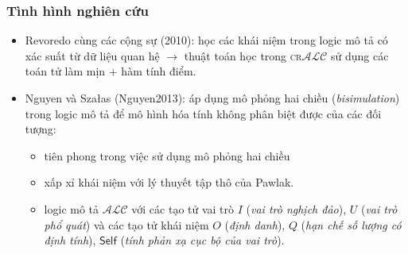 \documentclass[fleqn]{beamer}
\newcommand{\Self}		{\mathsf{Self}}
\newcommand{\ALC}		{$\mathcal{ALC}$\xspace}
\begin{document}
\begin{frame}\frametitle{\bf Tình hình nghiên cứu}
\begin{itemize}
  
  
  \item Revoredo cùng các cộng sự (2010): học các khái niệm trong logic mô tả có xác suất từ dữ liệu quan hệ $\rightarrow$ thuật toán học trong \textsc{cr}\ALC sử dụng các toán tử làm mịn + hàm tính điểm.
  \vspace{1.0ex}  

  \item Nguyen và Sza{\l}as (Nguyen2013): áp dụng mô phỏng hai chiều ({\em bisimulation}) trong logic mô tả để mô hình hóa tính không phân biệt được của các đối tượng:
  \vspace{1.0ex}  
  
  \begin{itemize}
    \item tiên phong trong việc sử dụng mô phỏng hai chiều 
    \vspace{1.0ex}  
    
    \item xấp xỉ khái niệm với lý thuyết tập thô của Pawlak.
    \vspace{1.0ex}  
    
    \item logic mô tả \ALC với các tạo tử vai trò $I$ ({\em vai trò nghịch đảo}), $U$ ({\em vai trò phổ quát}) và các tạo tử khái niệm $O$ ({\em định danh}), $Q$ ({\em hạn chế số lượng có định tính}), $\Self$ ({\em tính phản xạ cục bộ của vai trò}).
  \end{itemize}
\end{itemize}
\end{frame}
\end{document}
